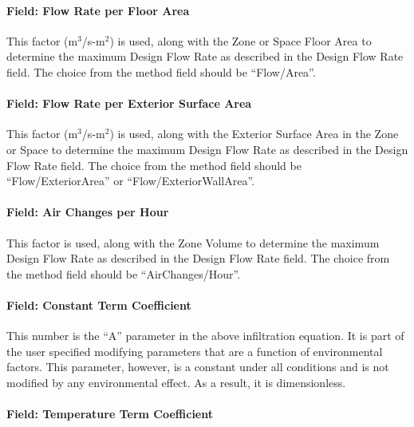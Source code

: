 \paragraph{Field: Flow Rate per Floor Area}\label{field-flow-per-zone-floor-area}

This factor (m\(^{3}\)/s-m\(^{2}\)) is used, along with the Zone or Space Floor Area to determine the maximum Design Flow Rate as described in the Design Flow Rate field. The choice from the method field should be ``Flow/Area''.

\paragraph{Field: Flow Rate per Exterior Surface Area}\label{field-flow-per-exterior-surface-area}

This factor (m\(^{3}\)/s-m\(^{2}\)) is used, along with the Exterior Surface Area in the Zone or Space to determine the maximum Design Flow Rate as described in the Design Flow Rate field. The choice from the method field should be ``Flow/ExteriorArea'' or ``Flow/ExteriorWallArea''.

\paragraph{Field: Air Changes per Hour}\label{field-air-changes-per-hour}

This factor is used, along with the Zone Volume to determine the maximum Design Flow Rate as described in the Design Flow Rate field. The choice from the method field should be ``AirChanges/Hour''.

\paragraph{Field: Constant Term Coefficient}\label{field-constant-term-coefficient}

This number is the ``A'' parameter in the above infiltration equation. It is part of the user specified modifying parameters that are a function of environmental factors. This parameter, however, is a constant under all conditions and is not modified by any environmental effect. As a result, it is dimensionless.

\paragraph{Field: Temperature Term Coefficient}\label{field-temperature-term-coefficient}

